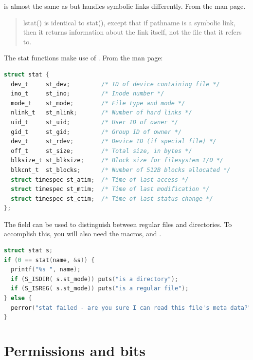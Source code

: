  is almost the same as  but handles symbolic links differently.
From the  man page.

\begin{quote}
    lstat() is identical to stat(), except that if pathname is a symbolic link, then it returns information about the link itself, not the file that it refers to.
\end{quote}

The stat functions make use of .
From the  man page:

\begin{lstlisting}[language=C]
struct stat {
  dev_t     st_dev;         /* ID of device containing file */
  ino_t     st_ino;         /* Inode number */
  mode_t    st_mode;        /* File type and mode */
  nlink_t   st_nlink;       /* Number of hard links */
  uid_t     st_uid;         /* User ID of owner */
  gid_t     st_gid;         /* Group ID of owner */
  dev_t     st_rdev;        /* Device ID (if special file) */
  off_t     st_size;        /* Total size, in bytes */
  blksize_t st_blksize;     /* Block size for filesystem I/O */
  blkcnt_t  st_blocks;      /* Number of 512B blocks allocated */
  struct timespec st_atim;  /* Time of last access */
  struct timespec st_mtim;  /* Time of last modification */
  struct timespec st_ctim;  /* Time of last status change */
};
\end{lstlisting}

The  field can be used to distinguish between regular files and directories.
To accomplish this, you will also need the macros,  and .

\begin{lstlisting}[language=C]
struct stat s;
if (0 == stat(name, &s)) {
  printf("%s ", name);
  if (S_ISDIR( s.st_mode)) puts("is a directory");
  if (S_ISREG( s.st_mode)) puts("is a regular file");
} else {
  perror("stat failed - are you sure I can read this file's meta data?");
}
\end{lstlisting}

\section{Permissions and bits}

